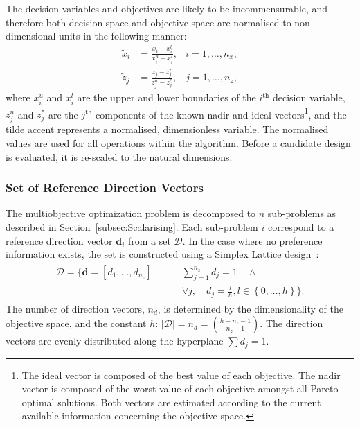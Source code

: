 \documentclass[10pt]{llncs}
\newcommand{\brs}[1]{\left[{#1}\right]} %
\newcommand{\brf}[1]{\left\lbrace{#1}\right\rbrace} %
\newcommand{\vd}{\mathbf{d}} %
\newcommand{\DSet}{\mathcal{D}} %
\begin{document}
The decision variables and objectives are likely to be incommensurable, and therefore both decision-space and objective-space are normalised to non-dimensional units in the following manner:
\begin{align}
	\tilde{x}_i &= \frac{x_i - x^l_i}{x^u_i - x^l_i} , &i=1,\ldots,n_x,\\
	\tilde{z}_j &= \frac{z_j - z^*_j}{z^n_j - z^*_j} , &j=1,\ldots,n_z,
\end{align}
where $x^u_i$ and $x^l_i$ are the upper and lower boundaries of the $i^\text{th}$ decision variable, $z^n_j$ and $z^*_j$ are the $j^\text{th}$ components of the known nadir and ideal vectors\footnote{The ideal vector is composed of the best value of each objective.
The nadir vector is composed of the worst value of each objective amongst all Pareto optimal solutions.
Both vectors are estimated according to the current available information concerning the objective-space.}, and the tilde accent represents a normalised, dimensionless variable.
The normalised values are used for all operations within the algorithm.
Before a candidate design is evaluated, it is re-scaled to the natural dimensions.

\subsubsection{Set of Reference Direction Vectors}
The multiobjective optimization problem is decomposed to $n$ sub-problems as described in Section~\ref{subsec:Scalarising}. Each sub-problem $i$ correspond to a reference direction vector $\vd_i$ from a set $\DSet$. In the case where no preference information exists, the set is constructed using a Simplex Lattice design~\cite{Scheffe1958Experiments}:
\begin{align}
	\label{eq:SimplexLattice}
	\begin{split}
		\DSet = \Biggl\lbrace\vd=\brs{d_1,\ldots,d_{n_z}}\quad \vert \quad &\sum_{j=1}^{n_z} d_j = 1 \quad \wedge \\
		& \forall j, \quad d_j = \frac{l}{h}, l\in\brf{0,\ldots,h} \Biggr\rbrace.
	\end{split}
\end{align}
The number of direction vectors, $n_d$, is determined by the dimensionality of the objective space, and the constant $h$: $\vert\DSet\vert = n_d = \binom{h+n_z-1}{n_z-1}$. The direction vectors are evenly distributed along the hyperplane $\sum d_j = 1$.
\end{document}
